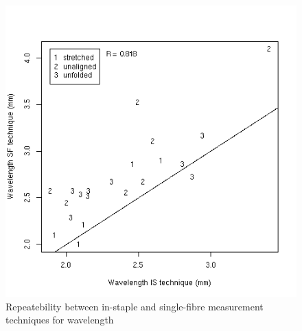 %

\begin{figure}[!h]
  \centering
  \includegraphics[width=1.0\textwidth]{figreptywavl.png}
  \caption{Repeatebility between in-staple and single-fibre measurement techniques for wavelength}
  \label{fig:reptywavl}
\end{figure}

%

